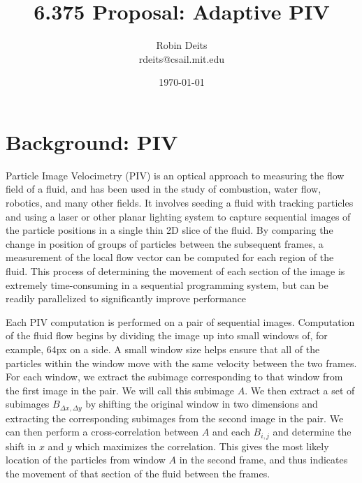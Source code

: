 \documentclass{article}
\begin{document}
	\author{Robin Deits\\ rdeits@csail.mit.edu}
	\title{6.375 Proposal: Adaptive PIV}
	\date{\today}
	\maketitle

	\section{Background: PIV} %
	\label{sec:background}
	Particle Image Velocimetry (PIV) is an optical approach to measuring the flow field of a fluid, and has been used in the study of combustion, water flow, robotics, and many other fields. It involves seeding a fluid with tracking particles and using a laser or other planar lighting system to capture sequential images of the particle positions in a single thin 2D slice of the fluid. By comparing the change in position of groups of particles between the subsequent frames, a measurement of the local flow vector can be computed for each region of the fluid. This process of determining the movement of each section of the image is extremely time-consuming in a sequential programming system, but can be readily parallelized to significantly improve performance \citep{Yu:2006tb}

	Each PIV computation is performed on a pair of sequential images. Computation of the fluid flow begins by dividing the image up into small windows of, for example, 64px on a side. A small window size helps ensure that all of the particles within the window move with the same velocity between the two frames. For each window, we extract the subimage corresponding to that window from the first image in the pair. We will call this subimage $A$. We then extract a set of subimages $B_{\Delta x,  \Delta y}$ by shifting the original window in two dimensions and extracting the corresponding subimages from the second image in the pair. We can then perform a cross-correlation between $A$ and each $B_{i, j}$ and determine the shift in $x$ and $y$ which maximizes the correlation. This gives the most likely location of the particles from window $A$ in the second frame, and thus indicates the movement of that section of the fluid between the frames.
\end{document}
